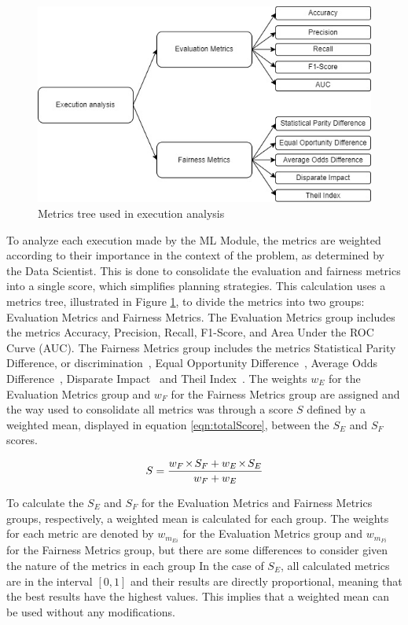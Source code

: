 \documentclass[sigconf]{acmart}
\let\oldtimes\times
\def\times{{\mkern1mu\oldtimes\mkern1mu}}
\begin{document}
\begin{figure}[h]
\centering
\includegraphics[scale=0.425]{images/metrics-tree.jpg}
\caption {Metrics tree used in execution analysis}
\label{fig:MetricTree}
\end{figure}

To analyze each execution made by the ML Module, the metrics are weighted according to their importance in the context of the problem, as determined by the Data Scientist. This is done to consolidate the evaluation and fairness metrics into a single score, which simplifies planning strategies. This calculation uses a metrics tree, illustrated in Figure \ref{fig:MetricTree}, to divide the metrics into two groups: Evaluation Metrics and Fairness Metrics. The Evaluation Metrics group includes the metrics Accuracy, Precision, Recall, F1-Score, and Area Under the ROC Curve (AUC). The Fairness Metrics group includes the metrics Statistical Parity Difference, or discrimination~\citep{Zemel_2013}, Equal Opportunity Difference~\citep{Biswas_2020}, Average Odds Difference~\citep{Biswas_2020}, Disparate Impact~\citep{Biswas_2020} and Theil Index~\citep{Speicher_2018}. The weights $w_E$ for the Evaluation Metrics group and $w_F$ for the Fairness Metrics group are assigned and the way used to consolidate all metrics was through a score $S$ defined by a weighted mean, displayed in equation \ref{eqn:totalScore}, between the $S_E$ and $S_F$ scores.

\begin{equation}
\label{eqn:totalScore}
	S = \frac{w_F \times S_F + w_E \times S_E}{w_F + w_E}
\end{equation}

To calculate the $S_E$ and $S_F$ for the Evaluation Metrics and Fairness Metrics groups, respectively, a weighted mean is calculated for each group. The weights for each metric are denoted by $w_{m_{Ei}}$ for the Evaluation Metrics group and $w_{m_{Fi}}$ for the Fairness Metrics group, but there are some differences to consider given the nature of the metrics in each group In the case of $S_E$, all calculated metrics are in the interval $\left[0,1 \right]$ and their results are directly proportional, meaning that the best results have the highest values. This implies that a weighted mean can be used without any modifications.
\end{document}
